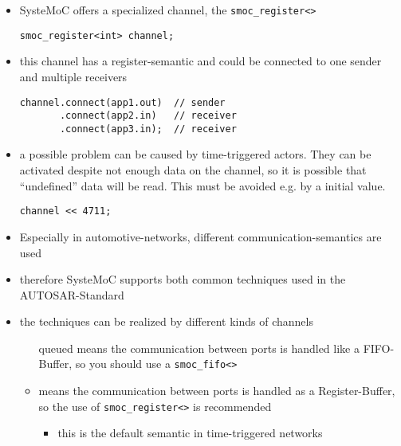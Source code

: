 \begin{frame}[fragile=singleslide]
\begin{itemize}
\item SysteMoC offers a specialized channel, the \lstinline{smoc_register<>}
\begin{lstlisting}
smoc_register<int> channel;
\end{lstlisting}
\item this channel has a register-semantic and could be connected to one sender and multiple receivers
\begin{lstlisting}
channel.connect(app1.out)  // sender
       .connect(app2.in)   // receiver
       .connect(app3.in);  // receiver
\end{lstlisting}
\item a possible problem can be caused by time-triggered actors. They can be activated despite not enough data on the channel,
 so it is possible that ``undefined'' data will be read. This must be avoided e.g. by a initial value.
\begin{lstlisting}
channel << 4711;
\end{lstlisting}
\end{itemize}
\end{frame}




\begin{frame}[fragile=singleslide]
\begin{itemize}
\item Especially in automotive-networks, different communication-semantics are used
\item therefore SysteMoC supports both common techniques used in the AUTOSAR-Standard
\item the techniques can be realized by different kinds of channels
\begin{itemize}
\item[queued] means the communication between ports is handled like a FIFO-Buffer, so you should use a \lstinline{smoc_fifo<>}
\item[last-is-best] means the communication between ports is handled as a Register-Buffer, so the use of \lstinline{smoc_register<>} is recommended
\begin{itemize}
\item this is the default semantic in time-triggered networks
\end{itemize}
\end{itemize}
\end{itemize}
\end{frame}


